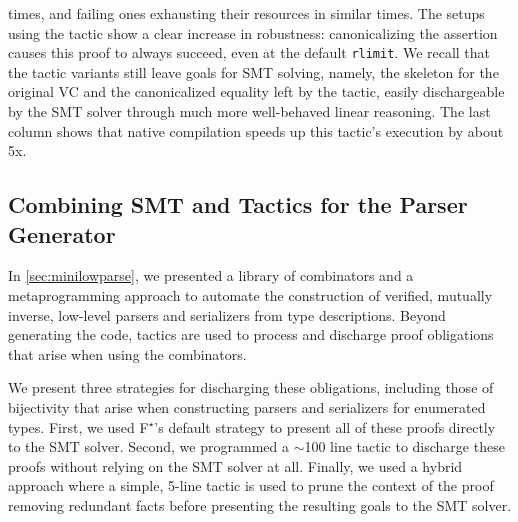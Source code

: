\documentclass[runningheads]{llncs}
\newcommand\fstar{F$^\star$\xspace}
\newcommand{\comm}[3]{\ifcheckpagebudget\else\ifdraft{{\color{#1}[#2: #3]}}\fi\fi}
\newcommand{\guido}[1]{\comm{blue}{Guido}{#1}}
\begin{document}
times, and failing ones exhausting their resources in similar times.
%
The setups using the tactic show a clear increase in
robustness: canonicalizing the assertion causes this proof to always
succeed, even at the default \texttt{rlimit}.
%
%
We recall that the
tactic variants still leave goals for SMT solving, namely, 
the skeleton for the original VC
and the canonicalized equality left by the tactic, easily dischargeable
by the SMT solver through much more well-behaved linear reasoning.
%
The last column shows that native compilation speeds up this tactic's
execution by about 5x.


\subsection{Combining SMT and Tactics for the Parser Generator}
\label{sec:eval-minilowparse}


In \autoref{sec:minilowparse}, we presented a library of combinators
and a metaprogramming approach to automate the construction of
verified, mutually inverse, low-level parsers and serializers from type
descriptions.
%
%
Beyond generating the code, tactics are used to process and discharge
proof obligations that arise when using the combinators.

We present three strategies for discharging these obligations,
including those of bijectivity that arise when constructing parsers
and serializers for enumerated types. First, we used \fstar's default
strategy to present all of these proofs directly to the SMT
solver. Second, we programmed a $\sim$100 line tactic to discharge
these proofs without relying on the SMT solver at all. Finally, we
used a hybrid approach where a simple, 5-line tactic is used to prune
the context of the proof removing redundant facts before presenting
the resulting goals to the SMT solver.

\end{document}
